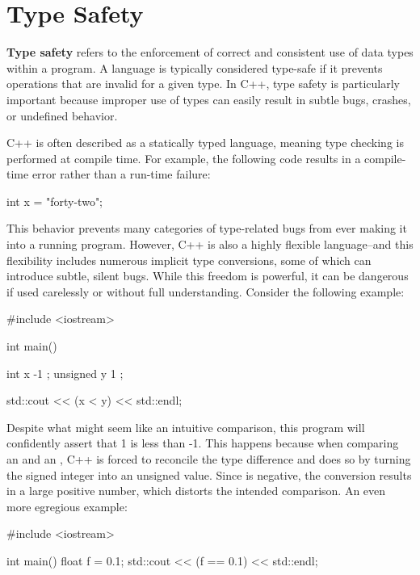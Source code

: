 \documentclass[12pt]{article}
\begin{document}
\tableofcontents

\pagebreak

\section{Type Safety}

\noindent
\textbf{Type safety} refers to the enforcement of correct and consistent use of data types within a program.
A language is typically considered type-safe if it prevents operations that are invalid for a given type.
In C++, type safety is particularly important because improper use of types can easily result in subtle bugs, crashes, or undefined behavior.

\vspace{1em}
\noindent
C++ is often described as a statically typed language, meaning type checking is performed at compile time.
For example, the following code results in a compile-time error rather than a run-time failure:

\begin{cxx}{}
int x = "forty-two";
\end{cxx}

\noindent
This behavior prevents many categories of type-related bugs from ever making it into a running program.
However, C++ is also a highly flexible language--and this flexibility includes numerous implicit type conversions, some of which can introduce subtle, silent bugs.
While this freedom is powerful, it can be dangerous if used carelessly or without full understanding.
Consider the following example:

\begin{cxx}{}
#include <iostream>

int main()
{
	int x { -1 };
	unsigned y { 1 };
	
	std::cout << (x < y) << std::endl;
}
\end{cxx}

\noindent
Despite what might seem like an intuitive comparison, this program will confidently assert that 1 is less than -1.
This happens because when comparing an  and an , C++ is forced to reconcile the type difference and does so by turning the signed integer  into an unsigned value.
Since  is negative, the conversion results in a large positive number, which distorts the intended comparison.
An even more egregious example:

\begin{cxx}{}
#include <iostream>

int main()
{
	float f = 0.1;
	std::cout << (f == 0.1) << std::endl;
}
\end{cxx}
\end{document}
